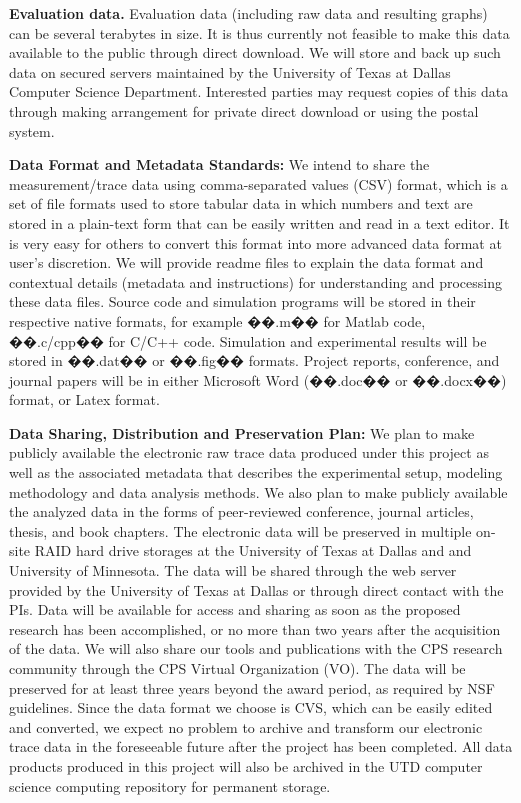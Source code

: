 \documentclass[10pt,letterpaper]{article}
\begin{document}
\vspace{1mm}
\noindent \textbf{Evaluation data.} Evaluation data (including raw data and resulting graphs) can be several terabytes in size. It is thus currently not feasible to make this data available to the public through direct download. We will store and back up such data on secured servers maintained by the University of Texas at Dallas Computer Science Department. Interested parties may request copies of this data through making arrangement for private direct download or using the postal system.

\vspace{1mm}
\noindent \textbf{Data Format and Metadata Standards: } We intend to share the measurement/trace data using comma-separated values (CSV) format, which is a set of file formats used to store tabular data in which numbers and text are stored in a plain-text form that can be easily written and read in a text editor.  It is very easy for others to convert this format into more advanced data format at user's discretion.  We will provide readme files to explain the data format and contextual details (metadata and instructions) for understanding and processing these data files. Source code and simulation programs will be stored in their respective native
formats, for example ��.m�� for Matlab code, ��.c/cpp�� for C/C++ code. Simulation and experimental results
will be stored in ��.dat�� or ��.fig�� formats. Project reports, conference, and journal papers will be in either
Microsoft Word (��.doc�� or ��.docx��) format, or Latex format.

\vspace{1mm}
\noindent \textbf{Data Sharing, Distribution and Preservation Plan: }
We plan to make publicly available the electronic raw trace data produced under this project as well as the associated metadata that describes the
experimental setup, modeling methodology and data analysis methods. We also plan to make publicly
available the analyzed data in the forms of peer-reviewed conference, journal articles, thesis, and book
chapters. The electronic data will be preserved in multiple on-site RAID hard drive storages at the
University of Texas at Dallas and  and University of Minnesota.
The data will be shared through the web server provided by the University of Texas at Dallas or through direct
contact with the PIs. Data will be available for access and sharing as soon as the proposed research has
been accomplished, or no more than two years after the acquisition of the data. 
We will also share our tools and publications with the CPS research community through the CPS Virtual Organization (VO). The data will be preserved for at least three years beyond the award period, as required by NSF guidelines. Since the data format we
choose is CVS, which can be easily edited and converted, we expect no problem to archive and transform
our electronic trace data in the foreseeable future after the project has been completed. All data products produced in this project will also be archived in the UTD computer science computing repository for permanent storage.
\end{document}

